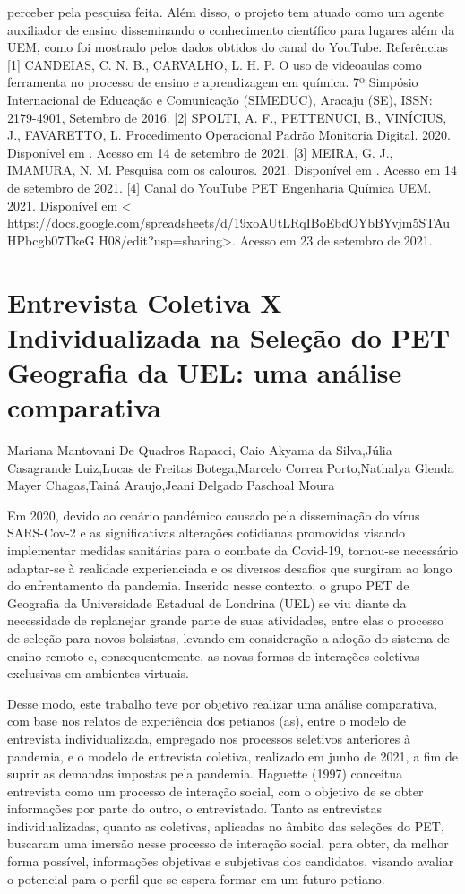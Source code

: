 perceber pela pesquisa feita. Além disso, o projeto tem atuado como um agente auxiliador de 
ensino disseminando o conhecimento científico para lugares além da UEM, como foi mostrado
pelos dados obtidos do canal do YouTube.
Referências 
[1] CANDEIAS, C. N. B., CARVALHO, L. H. P. O uso de videoaulas como ferramenta no 
processo de ensino e aprendizagem em química. 7º Simpósio Internacional de Educação e 
Comunicação (SIMEDUC), Aracaju (SE), ISSN: 2179-4901, Setembro de 2016.
[2] SPOLTI, A. F., PETTENUCI, B., VINÍCIUS, J., FAVARETTO, L. Procedimento 
Operacional Padrão Monitoria Digital. 2020. Disponível em . 
Acesso em 14 de setembro de 2021.
[3] MEIRA, G. J., IMAMURA, N. M. Pesquisa com os calouros. 2021. Disponível em
. Acesso em 14 de setembro de 2021. 
[4] Canal do YouTube PET Engenharia Química UEM. 2021. Disponível em <
https://docs.google.com/spreadsheets/d/19xoAUtLRqIBoEbdOYbBYvjm5STAuHPbcgb07TkeG
H08/edit?usp=sharing>. Acesso em 23 de setembro de 2021.



\section{Entrevista Coletiva X Individualizada na Seleção do PET Geografia da UEL: uma análise comparativa}

Mariana Mantovani De Quadros Rapacci, Caio Akyama da Silva,Júlia Casagrande Luiz,Lucas de Freitas Botega,Marcelo Correa Porto,Nathalya Glenda Mayer Chagas,Tainá Araujo,Jeani Delgado Paschoal Moura

Em 2020, devido ao cenário pandêmico causado pela disseminação do vírus SARS-Cov-2 e as significativas alterações cotidianas promovidas visando implementar medidas sanitárias para o combate da Covid-19, tornou-se necessário adaptar-se à realidade experienciada e os diversos desafios que surgiram ao longo do enfrentamento da pandemia. Inserido nesse contexto, o grupo PET de Geografia da Universidade Estadual de Londrina (UEL) se viu diante da necessidade de replanejar grande parte de suas atividades, entre elas o processo de seleção para novos bolsistas, levando em consideração a adoção do sistema de ensino remoto e, consequentemente, as novas formas de interações coletivas exclusivas em ambientes virtuais.

Desse modo, este trabalho teve por objetivo realizar uma análise comparativa, com base nos relatos de experiência dos petianos (as), entre o modelo de entrevista individualizada, empregado nos processos seletivos anteriores à pandemia, e o modelo de entrevista coletiva, realizado em junho de 2021, a fim de suprir as demandas impostas pela pandemia. Haguette (1997) conceitua entrevista como um processo de interação social, com o objetivo de se obter informações por parte do outro, o entrevistado. Tanto as entrevistas individualizadas, quanto as coletivas, aplicadas no âmbito das seleções do PET, buscaram uma imersão nesse processo de interação social, para obter, da melhor forma possível, informações objetivas e subjetivas dos candidatos, visando avaliar o potencial para o perfil que se espera formar em um futuro petiano.

